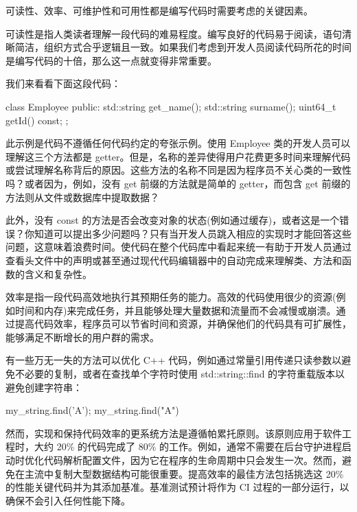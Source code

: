 
可读性、效率、可维护性和可用性都是编写代码时需要考虑的关键因素。


可读性是指人类读者理解一段代码的难易程度。编写良好的代码易于阅读，语句清晰简洁，组织方式合乎逻辑且一致。如果我们考虑到开发人员阅读代码所花的时间是编写代码的十倍，那么这一点就变得非常重要。

我们来看看下面这段代码：

\begin{cpp}
class Employee {
public:
    std::string get_name();
    std::string surname();
    uint64_t getId() const;
};
\end{cpp}

此示例是代码不遵循任何代码约定的夸张示例。使用 Employee 类的开发人员可以理解这三个方法都是 getter。但是，名称的差异使得用户花费更多时间来理解代码或尝试理解名称背后的原因。这些方法的名称不同是因为程序员不关心类的一致性吗？或者因为，例如，没有 get 前缀的方法就是简单的 getter，而包含 get 前缀的方法则从文件或数据库中提取数据？

此外，没有 const 的方法是否会改变对象的状态(例如通过缓存)，或者这是一个错误？你知道可以提出多少问题吗？只有当开发人员跳入相应的实现时才能回答这些问题，这意味着浪费时间。使代码在整个代码库中看起来统一有助于开发人员通过查看头文件中的声明或甚至通过现代代码编辑器中的自动完成来理解类、方法和函数的含义和复杂性。


效率是指一段代码高效地执行其预期任务的能力。高效的代码使用很少的资源(例如时间和内存)来完成任务，并且能够处理大量数据和流量而不会减慢或崩溃。通过提高代码效率，程序员可以节省时间和资源，并确保他们的代码具有可扩展性，能够满足不断增长的用户群的需求。

有一些万无一失的方法可以优化 C++ 代码，例如通过常量引用传递只读参数以避免不必要的复制，或者在查找单个字符时使用 std::string::find 的字符重载版本以避免创建字符串：

\begin{cpp}
my_string.find('A');
my_string.find("A")
\end{cpp}

然而，实现和保持代码效率的更系统方法是遵循帕累托原则。该原则应用于软件工程时，大约 20\% 的代码完成了 80\% 的工作。例如，通常不需要在后台守护进程启动时优化代码解析配置文件，因为它在程序的生命周期中只会发生一次。然而，避免在主流中复制大型数据结构可能很重要。提高效率的最佳方法包括挑选这 20\% 的性能关键代码并为其添加基准。基准测试预计将作为 CI 过程的一部分运行，以确保不会引入任何性能下降。

